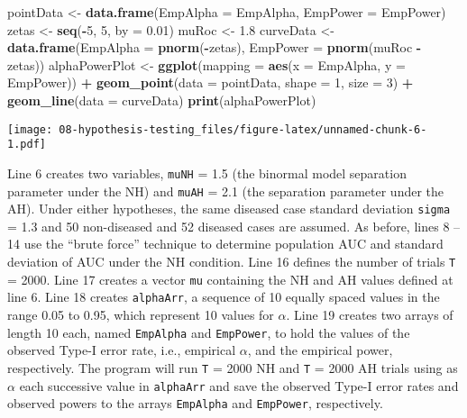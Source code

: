 \documentclass[
]{book}
\newenvironment{Shaded}{\begin{snugshade}}{\end{snugshade}}
\newcommand{\DataTypeTok}[1]{\textcolor[rgb]{0.13,0.29,0.53}{#1}}
\newcommand{\DecValTok}[1]{\textcolor[rgb]{0.00,0.00,0.81}{#1}}
\newcommand{\FloatTok}[1]{\textcolor[rgb]{0.00,0.00,0.81}{#1}}
\newcommand{\KeywordTok}[1]{\textcolor[rgb]{0.13,0.29,0.53}{\textbf{#1}}}
\newcommand{\NormalTok}[1]{#1}
\newcommand{\OperatorTok}[1]{\textcolor[rgb]{0.81,0.36,0.00}{\textbf{#1}}}
\newcommand{\StringTok}[1]{\textcolor[rgb]{0.31,0.60,0.02}{#1}}
\begin{document}
\begin{Shaded}
\begin{Highlighting}[]
\NormalTok{pointData \textless{}{-}}\StringTok{ }\KeywordTok{data.frame}\NormalTok{(}\DataTypeTok{EmpAlpha =}\NormalTok{ EmpAlpha, }\DataTypeTok{EmpPower =}\NormalTok{ EmpPower)}
\NormalTok{zetas \textless{}{-}}\StringTok{ }\KeywordTok{seq}\NormalTok{(}\OperatorTok{{-}}\DecValTok{5}\NormalTok{, }\DecValTok{5}\NormalTok{, }\DataTypeTok{by =} \FloatTok{0.01}\NormalTok{)}
\NormalTok{muRoc \textless{}{-}}\StringTok{ }\FloatTok{1.8}
\NormalTok{curveData \textless{}{-}}\StringTok{ }\KeywordTok{data.frame}\NormalTok{(}\DataTypeTok{EmpAlpha =} \KeywordTok{pnorm}\NormalTok{(}\OperatorTok{{-}}\NormalTok{zetas), }\DataTypeTok{EmpPower =} \KeywordTok{pnorm}\NormalTok{(muRoc }\OperatorTok{{-}}\StringTok{ }\NormalTok{zetas))}
\NormalTok{alphaPowerPlot \textless{}{-}}\StringTok{ }\KeywordTok{ggplot}\NormalTok{(}\DataTypeTok{mapping =} \KeywordTok{aes}\NormalTok{(}\DataTypeTok{x =}\NormalTok{ EmpAlpha, }\DataTypeTok{y =}\NormalTok{ EmpPower)) }\OperatorTok{+}\StringTok{ }\KeywordTok{geom\_point}\NormalTok{(}\DataTypeTok{data =}\NormalTok{ pointData, }\DataTypeTok{shape =} \DecValTok{1}\NormalTok{, }\DataTypeTok{size =} \DecValTok{3}\NormalTok{) }\OperatorTok{+}\StringTok{ }\KeywordTok{geom\_line}\NormalTok{(}\DataTypeTok{data =}\NormalTok{ curveData)}
\KeywordTok{print}\NormalTok{(alphaPowerPlot)}
\end{Highlighting}
\end{Shaded}

\texttt{[image: 08-hypothesis-testing\_files/figure-latex/unnamed-chunk-6-1.pdf]}

Line 6 creates two variables, \texttt{muNH} = 1.5 (the binormal model separation parameter under the NH) and \texttt{muAH} = 2.1 (the separation parameter under the AH). Under either hypotheses, the same diseased case standard deviation \texttt{sigma} = 1.3 and 50 non-diseased and 52 diseased cases are assumed. As before, lines 8 -- 14 use the ``brute force'' technique to determine population AUC and standard deviation of AUC under the NH condition. Line 16 defines the number of trials \texttt{T} = 2000. Line 17 creates a vector \texttt{mu} containing the NH and AH values defined at line 6. Line 18 creates \texttt{alphaArr}, a sequence of 10 equally spaced values in the range 0.05 to 0.95, which represent 10 values for \(\alpha\). Line 19 creates two arrays of length 10 each, named \texttt{EmpAlpha} and \texttt{EmpPower}, to hold the values of the observed Type-I error rate, i.e., empirical \(\alpha\), and the empirical power, respectively. The program will run \texttt{T} = 2000 NH and \texttt{T} = 2000 AH trials using as \(\alpha\) each successive value in \texttt{alphaArr} and save the observed Type-I error rates and observed powers to the arrays \texttt{EmpAlpha} and \texttt{EmpPower}, respectively.
\end{document}
